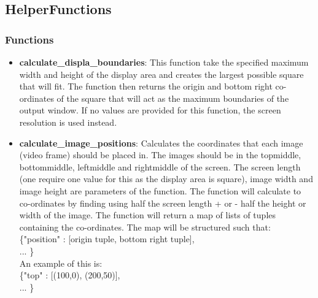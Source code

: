 \documentclass{article}
\begin{document}
\subsection{HelperFunctions}
\subsubsection{Functions}

\begin{itemize}
	\item \textbf{calculate\_displa\_boundaries}: This function take the specified maximum width and height of the display area and creates the largest possible square that will fit. The function then returns the origin and bottom right co-ordinates of the square that will act as the maximum boundaries of the output window. If no values are provided for this function, the screen resolution is used instead.
	
	\item \textbf{calculate\_image\_positions}: Calculates the co\-ordinates that each image (video frame) should be placed in. The images should be in the top\-middle, bottom\-middle, left\-middle and right\-middle of the screen. The screen length (one require one value for this as the display area is square), image width and image height are parameters of the function. The function will calculate to co-ordinates by finding using half the screen length + or - half the height or width of the image. The function will return a map of lists of tuples containing the co-ordinates. The map will be structured such that: \\
	\{"position" : [origin tuple, bottom right tuple],\\... \} \\
	An example of this is: \\
	\{"top" : [(100,0), (200,50)],\\... \} 
\end{itemize}
\end{document}
